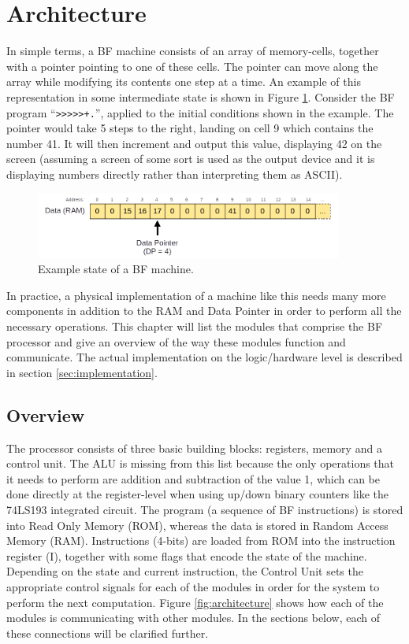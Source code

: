\section{Architecture} \label{sec:architecture}
In simple terms, a BF machine consists of an array of memory-cells, together with a pointer pointing to one of these cells. The pointer can move along the array while modifying its contents one step at a time. An example of this representation in some intermediate state is shown in Figure \ref{fig:simplerepresentation}. Consider the BF program ``\texttt{>>>>>+.}'', applied to the initial conditions shown in the example. The pointer would take 5 steps to the right, landing on cell 9 which contains the number 41. It will then increment and output this value, displaying 42 on the screen (assuming a screen of some sort is used as the output device and it is displaying numbers directly rather than interpreting them as ASCII).

\begin{figure}[H]
  \centering
  \includegraphics[width=0.9\textwidth]{img/simple_representation}
  \caption{Example state of a BF machine.}
  \label{fig:simplerepresentation}
\end{figure}


In practice, a physical implementation of a machine like this needs many more components in addition to the RAM and Data Pointer in order to perform all the necessary operations. This chapter will list the modules that comprise the BF processor and give an overview of the way these modules function and communicate. The actual implementation on the logic/hardware level is described in section \ref{sec:implementation}.

\subsection{Overview} \label{sec:architecture:overview}
The processor consists of three basic building blocks: registers, memory and a control unit. The ALU is missing from this list because the only operations that it needs to perform are addition and subtraction of the value 1, which can be done directly at the register-level when using up/down binary counters like the 74LS193 integrated circuit. The program (a sequence of BF instructions) is stored into Read Only Memory (ROM), whereas the data is stored in Random Access Memory (RAM). Instructions (4-bits) are loaded from ROM into the instruction register (I), together with some flags that encode the state of the machine. Depending on the state and current instruction, the Control Unit sets the appropriate control signals for each of the modules in order for the system to perform the next computation. Figure \ref{fig:architecture} shows how each of the modules is communicating with other modules. In the sections below, each of these connections will be clarified further.

